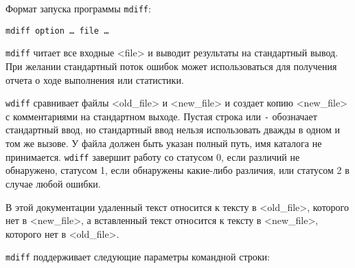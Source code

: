 Формат запуска программы \texttt{mdiff}:

\begin{verbatim}
mdiff option … file …
\end{verbatim}

\texttt{mdiff} читает все входные \textless file\textgreater{} и выводит
результаты на стандартный вывод. При желании стандартный поток ошибок
может использоваться для получения отчета о ходе выполнения или
статистики.

\texttt{wdiff} сравнивает файлы \textless old\_file\textgreater{} и
\textless new\_file\textgreater{} и создает копию
\textless new\_file\textgreater{} с комментариями на стандартном выходе.
Пустая строка или \texttt{-} обозначает стандартный ввод, но стандартный
ввод нельзя использовать дважды в одном и том же вызове. У файла должен
быть указан полный путь, имя каталога не принимается. \texttt{wdiff}
завершит работу со статусом 0, если различий не обнаружено, статусом 1,
если обнаружены какие-либо различия, или статусом 2 в случае любой
ошибки.

В этой документации удаленный текст относится к тексту в
\textless old\_file\textgreater, которого нет в
\textless new\_file\textgreater, а вставленный текст относится к тексту
в \textless new\_file\textgreater, которого нет в
\textless old\_file\textgreater.

\texttt{mdiff} поддерживает следующие параметры командной строки:

